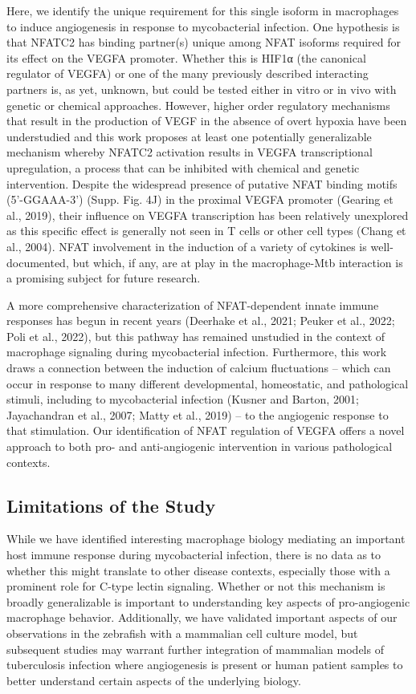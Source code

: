Here, we identify the unique requirement for this single isoform in macrophages to induce angiogenesis in response to mycobacterial infection. One hypothesis is that NFATC2 has binding partner(s) unique among NFAT isoforms required for its effect on the VEGFA promoter. Whether this is HIF1α (the canonical regulator of VEGFA) or one of the many previously described interacting partners is, as yet, unknown, but could be tested either in vitro or in vivo with genetic or chemical approaches. However, higher order regulatory mechanisms that result in the production of VEGF in the absence of overt hypoxia have been understudied and this work proposes at least one potentially generalizable mechanism whereby NFATC2 activation results in VEGFA transcriptional upregulation, a process that can be inhibited with chemical and genetic intervention. Despite the widespread presence of putative NFAT binding motifs (5’-GGAAA-3’) (Supp. Fig. 4J) in the proximal VEGFA promoter (Gearing et al., 2019), their influence on VEGFA transcription has been relatively unexplored as this specific effect is generally not seen in T cells or other cell types (Chang et al., 2004). NFAT involvement in the induction of a variety of cytokines is well-documented, but which, if any, are at play in the macrophage-Mtb interaction is a promising subject for future research. 

A more comprehensive characterization of NFAT-dependent innate immune responses has begun in recent years (Deerhake et al., 2021; Peuker et al., 2022; Poli et al., 2022), but this pathway has remained unstudied in the context of macrophage signaling during mycobacterial infection. Furthermore, this work draws a connection between the induction of calcium fluctuations – which can occur in response to many different developmental, homeostatic, and pathological stimuli, including to mycobacterial infection (Kusner and Barton, 2001; Jayachandran et al., 2007; Matty et al., 2019) – to the angiogenic response to that stimulation. Our identification of NFAT regulation of VEGFA offers a novel approach to both pro- and anti-angiogenic intervention in various pathological contexts.

\subsection{Limitations of the Study}

While we have identified interesting macrophage biology mediating an important host immune response during mycobacterial infection, there is no data as to whether this might translate to other disease contexts, especially those with a prominent role for C-type lectin signaling. Whether or not this mechanism is broadly generalizable is important to understanding key aspects of pro-angiogenic macrophage behavior. Additionally, we have validated important aspects of our observations in the zebrafish with a mammalian cell culture model, but subsequent studies may warrant further integration of mammalian models of tuberculosis infection where angiogenesis is present or human patient samples to better understand certain aspects of the underlying biology.




